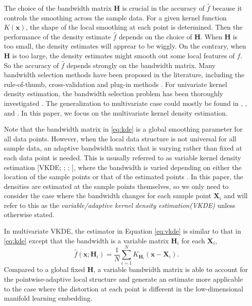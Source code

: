 \documentclass[11pt,a4paper,]{article}
\begin{document}
The choice of the bandwidth matrix \(\pmb{H}\) is crucial in the accuracy of \(\hat{f}\) because it controls the smoothing across the sample data. For a given kernel function \(K(\pmb{x})\), the shape of the local smoothing at each point is determined. Then the performance of the density estimate \(\hat{f}\) depends on the choice of \(\pmb{H}\). When \(\pmb{H}\) is too small, the density estimates will apprear to be wiggly. On the contrary, when \(\pmb{H}\) is too large, the density estimates might smooth out some local features of \(f\). So the accuracy of \(\hat{f}\) depends strongly on the bandwidth matrix.
Many bandwidth selection methods have been proposed in the literature, including the rule-of-thumb, cross-validation and plug-in methods \autocites[See][ for details]{Heidenreich2013-bl,Scott2015-vl}. For univariate kernel density estimation, the bandwidth selection problem has been thoroughly investigated \autocites[See][ for reviews]{Jones1992-ef,Cao1994-st,Jones1996-cb,Wand1994-xu}. The generalization to multivariate case could mostly be found in \textcite{Duong2003-sp}, \textcite{Duong2004-rh}, and \textcite{Chacon2010-wm}. In this paper, we focus on the multivariate kernel density estimation.

Note that the bandwidth matrix in \eqref{eq:kde} is a global smoothing parameter for all data points. However, when the local data structure is not universal for all sample data, an adaptive bandwidth matrix that is varying rather than fixed at each data point is needed. This is ususally referred to as variable kernel density estimation {[}VKDE; \textcite{Breiman1977-qc}; \textcite{Jones1990-oe}; \textcite{Terrell1992-ut}{]}, where the bandwidth is varied depending on either the location of the sample points or that of the estimated points \autocite[Section 6.6 of][]{Scott2015-vl}. In this paper, the densities are estimated at the sample points themselves, so we only need to consider the case where the bandwidth changes for each sample point \(\pmb{X}_i\) and will refer to this as the \emph{variable/adaptive kernel density estimation(VKDE)} unless otherwise stated.

In multivariate VKDE, the estimator in Equation \eqref{eq:vkde} is similar to that in \eqref{eq:kde} except that the bandwidth is a variable matrix \(\pmb{H}_i\) for each \(\pmb{X}_i\),
\begin{equation}
\label{eq:vkde}
\hat{f}(\pmb{x};\pmb{H}_i)=\frac{1}{N}\sum\limits_{i=1}^N K_{\pmb{H}_i}(\pmb{x}-\pmb{X}_i).
\end{equation}
Compared to a global fixed \(\pmb{H}\), a variable bandwidth matrix is able to account for the pointwise-adaptive local structure and generate an estimate more applicable to the case where the distortion at each point is different in the low-dimensional manifold learning embedding.
\end{document}
